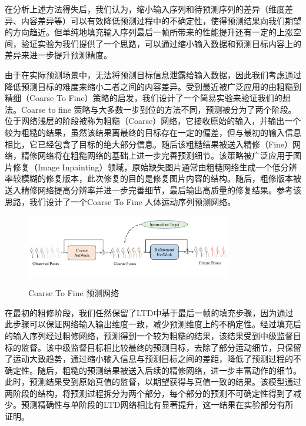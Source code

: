在分析上述方法得失后，我们认为，缩小输入序列和待预测序列的差异（维度差异、内容差异等）可以有效降低预测过程中的不确定性，使得预测结果向我们期望的方向趋近。但单纯地填充输入序列最后一帧所带来的性能提升还有一定的上涨空间，验证实验为我们提供了一个思路，可以通过缩小输入数据和预测目标内容上的差异来进一步提升预测精度。

由于在实际预测场景中，无法将预测目标信息泄露给输入数据，因此我们考虑通过降低预测目标的难度来缩小二者之间的内容差异。受到最近被广泛应用的由粗糙到精细（Coarse To Fine）策略的启发，我们设计了一个简易实验来验证我们的想法。Coarse to fine 策略与大多数一步到位的方法不同，预测被分为了两个阶段。位于网络浅层的阶段被称为粗糙（Coarse）网络，它接收原始的输入，并输出一个较为粗糙的结果，虽然该结果离最终的目标存在一定的偏差，但与最初的输入信息相比，它已经包含了目标的绝大部分信息。随后该粗糙结果被送入精修（Fine）网络，精修网络将在粗糙网络的基础上进一步完善预测细节。该策略被广泛应用于图片修复（Image Inpainting）\parencite{yu2018generative,zamir2021multi}领域，原始缺失图片通常由粗糙网络生成一个低分辨率较模糊的修复版本，此次修复的目的是修复图片内容的结构。随后，粗修版本被送入精修网络提高分辨率并进一步完善细节，最后输出高质量的修复结果。参考该思路，我们设计了一个Coarse To Fine 人体运动序列预测网络。

\begin{figure}[ht]
    \centering
    \includegraphics[width=0.8\textwidth]{FigMa/Two_stage.png}\\
    \vspace{-0.3cm}
    \caption{Coarse To Fine 预测网络}
    \label{fig:Two_stage}
\end{figure}

在最初的粗修阶段，我们任然保留了LTD中基于最后一帧的填充步骤，因为通过此步骤可以保证网络输入输出维度一致，减少预测维度上的不确定性。经过填充后的输入序列经过粗修网络，预测得到一个较为粗糙的结果，该结果受到中级监督目标的监督。该中级监督目标相比较最终的预测目标，去除了部分运动细节，只保留了运动大致趋势，通过缩小输入信息与预测目标之间的差距，降低了预测过程的不确定性。随后，粗糙的预测结果被送入后续的精修网络，进一步丰富动作的细节。此时，预测结果受到原始真值的监督，以期望获得与真值一致的结果。该模型通过两阶段的结构，将预测过程拆分为两个部分，每个部分的预测不可确定性得到了减少。预测精确性与单阶段的LTD网络相比有显著提升，这一结果在实验部分有所证明。
